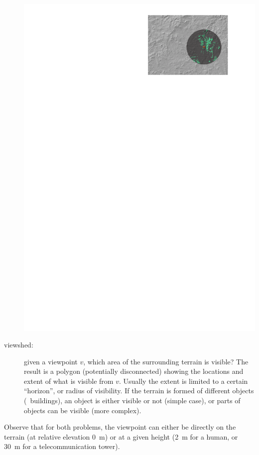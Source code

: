 \begin{description}
\begin{marginfigure}
    \includegraphics[width=\linewidth]{overview_viewshed}
    \caption{The viewshed at the location marked with a red star (green = visible; maximum view distance (dark grey) is set to \qty{15}{\km}).}%
    \label{fig:overview_viewshed}
  \end{marginfigure} 
  \item[viewshed:] given a viewpoint $v$, which area of the surrounding terrain is visible? The result is a polygon (potentially disconnected) showing the locations and extent of what is visible from $v$. Usually the extent is limited to a certain ``horizon'', or radius of visibility. If the terrain is formed of different objects (\eg\ buildings), an object is either visible or not (simple case), or parts of objects can be visible (more complex).
\end{description}
Observe that for both problems, the viewpoint can either be directly on the terrain (at relative elevation \qty{0}{\m}) or at a given height (\qty{2}{\m} for a human, or \qty{30}{\m} for a telecommunication tower).

